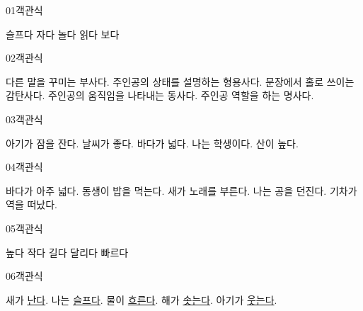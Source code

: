 \documentclass[fs85,seriesRus]{korfarm-base}
\begin{document}

\par\medskip
\kfBeginMC
\begin{kfQBlock}{01}{객관식}
\begin{kfChoices}
\kfChoice 슬프다
\kfChoice 자다
\kfChoice 놀다
\kfChoice 읽다
\kfChoice 보다
\end{kfChoices}
\end{kfQBlock}
\begin{kfQBlock}{02}{객관식}
\begin{kfChoices}
\kfChoice 다른 말을 꾸미는 부사다.
\kfChoice 주인공의 상태를 설명하는 형용사다.
\kfChoice 문장에서 홀로 쓰이는 감탄사다.
\kfChoice 주인공의 움직임을 나타내는 동사다.
\kfChoice 주인공 역할을 하는 명사다.
\end{kfChoices}
\end{kfQBlock}
\begin{kfQBlock}{03}{객관식}
\begin{kfChoices}
\kfChoice 아기가 잠을 잔다.
\kfChoice 날씨가 좋다.
\kfChoice 바다가 넓다.
\kfChoice 나는 학생이다.
\kfChoice 산이 높다.
\end{kfChoices}
\end{kfQBlock}
\begin{kfQBlock}{04}{객관식}
\begin{kfChoices}
\kfChoice 바다가 아주 넓다.
\kfChoice 동생이 밥을 먹는다.
\kfChoice 새가 노래를 부른다.
\kfChoice 나는 공을 던진다.
\kfChoice 기차가 역을 떠났다.
\end{kfChoices}
\end{kfQBlock}
\begin{kfQBlock}{05}{객관식}
\begin{kfChoices}
\kfChoice 높다
\kfChoice 작다
\kfChoice 길다
\kfChoice 달리다
\kfChoice 빠르다
\end{kfChoices}
\end{kfQBlock}
\begin{kfQBlock}{06}{객관식}
\begin{kfChoices}
\kfChoice 새가 \uline{난다}.
\kfChoice 나는 \uline{슬프다}.
\kfChoice 물이 \uline{흐른다}.
\kfChoice 해가 \uline{솟는다}.
\kfChoice 아기가 \uline{웃는다}.
\end{kfChoices}
\end{kfQBlock}
\end{document}
